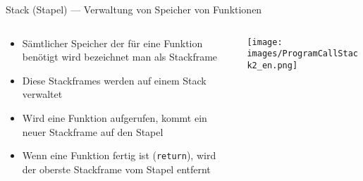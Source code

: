 \documentclass[presentation]{beamer}
\begin{document}
\begin{frame}[label={sec:org1291765},fragile]{Stack (Stapel) --- Verwaltung von Speicher von Funktionen}
 \begin{columns}
\begin{column}{0.5\columnwidth}
\begin{itemize}
\item Sämtlicher Speicher der für eine Funktion benötigt wird bezeichnet
man als \alert{Stackframe}
\item Diese Stackframes werden auf einem Stack verwaltet
\item Wird eine \alert{Funktion aufgerufen}, kommt ein \alert{neuer Stackframe auf den
Stapel}
\item Wenn eine \alert{Funktion fertig} ist ({\color{solarizedYellow}\verb!return!}), wird der oberste
Stackframe vom Stapel \alert{entfernt}
\end{itemize}
\end{column}
\begin{column}{0.5\columnwidth}
\begin{center}
\texttt{[image: images/ProgramCallStack2\_en.png]}
\end{center}
\end{column}
\end{columns}
\end{frame}
\end{document}
